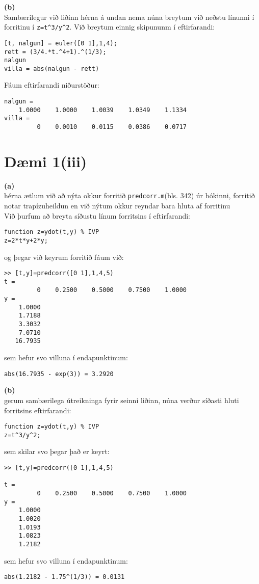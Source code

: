 \documentclass[11pt]{article}
\begin{document}
\noindent \textbf{(b)}\\
Sambærilegur við liðinn hérna á undan nema núna breytum við neðstu línunni í forritinu í \texttt{z=t^3/y^2}. Við breytum einnig skipununm í eftirfarandi:
\begin{verbatim}
[t, nalgun] = euler([0 1],1,4);
rett = (3/4.*t.^4+1).^(1/3);
nalgun
villa = abs(nalgun - rett)
\end{verbatim}
\noindent Fáum eftirfarandi niðurstöður:
\begin{verbatim}
nalgun =
    1.0000    1.0000    1.0039    1.0349    1.1334
villa =
         0    0.0010    0.0115    0.0386    0.0717

\end{verbatim}

\section*{Dæmi 1(iii)}
\textbf{(a)}\\
hérna ætlum við að nýta okkur forritið \texttt{predcorr.m}(bls. 342) úr bókinni, forritið notar trapízuheildun en við nýtum okkur reyndar bara hluta af forritinu \\
Við þurfum að breyta síðustu línum forritsins í eftirfarandi:
\begin{verbatim}
function z=ydot(t,y) % IVP
z=2*t*y+2*y;
\end{verbatim}
og þegar við keyrum forritið fáum við:
\begin{verbatim}
>> [t,y]=predcorr([0 1],1,4,5)
t =
         0    0.2500    0.5000    0.7500    1.0000
y =
    1.0000
    1.7188
    3.3032
    7.0710
   16.7935
\end{verbatim}
sem hefur svo villuna í endapunktinum:
\begin{verbatim}
abs(16.7935 - exp(3)) = 3.2920
\end{verbatim}
\textbf{(b)}\\
gerum sambærilega útreikninga fyrir seinni liðinn, núna verður síðasti hluti forritsins eftirfarandi:
\begin{verbatim}
function z=ydot(t,y) % IVP
z=t^3/y^2;
\end{verbatim}
sem skilar svo þegar það er keyrt:
\begin{verbatim}
>> [t,y]=predcorr([0 1],1,4,5)

t =
         0    0.2500    0.5000    0.7500    1.0000
y =
    1.0000
    1.0020
    1.0193
    1.0823
    1.2182
\end{verbatim}
sem hefur svo villuna í endapunktinum:
\begin{verbatim}
abs(1.2182 - 1.75^(1/3)) = 0.0131
\end{verbatim}
\end{document}
